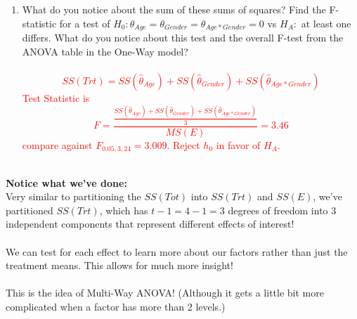 \begin{enumerate}
\item What do you notice about the sum of these sums of squares?  Find the F-statistic for a test of $H_0:\theta_{Age}=\theta_{Gender}=\theta_{Age*Gender}=0$ vs $H_A:$ at least one differs.  What do you notice about this test and the overall F-test from the ANOVA table in the One-Way model?
\textcolor{red}{\\~\\
$$SS(Trt)=SS(\hat{\theta}_{Age})+SS(\hat{\theta}_{Gender})+SS(\hat{\theta}_{Age*Gender})$$
Test Statistic is 
$$F=\frac{\frac{SS(\hat{\theta}_{Age})+SS(\hat{\theta}_{Gender})+SS(\hat{\theta}_{Age*Gender})}{3}}{MS(E)}=3.46$$
compare against $F_{0.05,3,24}=3.009$.  Reject $h_0$ in favor of $H_A$.}\\~\\
\end{enumerate}

\textbf{Notice what we've done:}\\
Very similar to partitioning the $SS(Tot)$ into $SS(Trt)$ and $SS(E)$, we've partitioned $SS(Trt)$, which has $t-1=4-1=3$ degrees of freedom into 3 independent components that represent different effects of interest!  \\~\\
We can test for each effect to learn more about our factors rather than just the treatment means.  This allows for much more insight!\\~\\
This is the idea of Multi-Way ANOVA!  (Although it gets a little bit more complicated when a factor has more than 2 levels.)

\newpage


